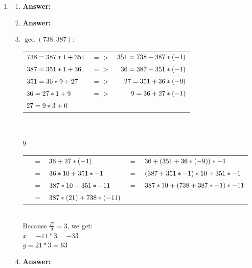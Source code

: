 \documentclass[8pt,a4paper]{article}
\begin{document}
\begin{enumerate}[itemsep=20pt]
\item
	\begin{enumerate}
		\item
			\textbf{Answer: }\\
		\item
			\textbf{Answer: }\\
		\item
			$ \gcd(738,387):$\\
			\begin{tabular}[t]{l c r}
			\($$738=387*1+351$$\) 	& \(=>\) 	& \($$351=738+387*(-1)$$\)\\
			\($$387=351*1+36$$\) 	& \(=>\) 	&\($$36=387+351*(-1)$$\)\\
			\($$351=36*9+27$$\) 	& \(=>\) 	&\($$27=351+36*(-9)$$\)\\
			\($$36=27*1+9$$\) 		& \(=>\) 	& \($$9=36+27*(-1)$$\)\\
			\($$27=9*3+0$$\)\\
			\end{tabular}\\
			
			\\
			9
			\begin{tabular}[t]{l l l l l}
			  & \(=\) & \($$36+27*(-1)$$\) 		& \(=\) & \($$36+(351+36*(-9))*-1$$\)\\
			  & \(=\) & \($$36*10+351*-1$$\) 	& \(=\) & \($$(387+351*-1)*10+351*-1$$\)\\
			  & \(=\) & \($$387*10+351*-11$$\) 	& \(=\) & \($$387*10+(738+387*-1)*-11$$\)\\
			  & \(=\) & \($$387*(21)+738*(-11)$$\)\\
			\end{tabular}\\
			
			Because $\frac{27}{9}=3$, we get:\\
			$x=-11*3=-33$\\
			$y=21*3=63$\\
		\item
			\textbf{Answer: }
	\end{enumerate}
		
\end{enumerate}
\end{document}
